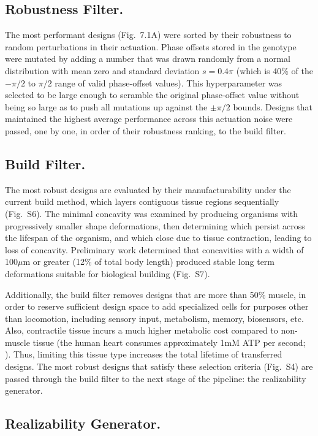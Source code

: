 \subsection*{Robustness Filter.}

The most performant designs (Fig.~7.1A) were sorted by their robustness to random perturbations in their actuation. 
Phase offsets stored in the genotype were mutated by adding a number that was drawn randomly from a normal distribution with mean zero and standard deviation $s = 0.4\pi$ (which is 40\% of the $-\pi/2$ to $\pi/2$ range of valid phase-offset values). 
This hyperparameter was selected to be large enough to scramble the original phase-offset value without being so large as to push all mutations up against the $\pm\pi/2$ bounds. 
Designs that maintained the highest average performance across this actuation noise were passed, one by one, in order of their robustness ranking, to the build filter.

\subsection*{Build Filter.}

The most robust designs are evaluated by their manufacturability under the current build method, which layers contiguous tissue regions sequentially (Fig.~S6). 
The minimal concavity was examined by producing organisms with progressively smaller shape deformations, then determining which persist across the lifespan of the organism, and which close due to tissue contraction, leading to loss of concavity.
Preliminary work determined that concavities with a width of 100{$\mu$}m or greater (12\% of total body length) produced stable long term deformations suitable for biological building (Fig.~S7). 

Additionally, the build filter removes designs that are more than 50\% muscle, in order to reserve sufficient design space to add specialized cells for purposes other than locomotion, including sensory input, metabolism, memory, biosensors, etc. 
Also, contractile tissue incurs a much higher metabolic cost compared to non-muscle tissue (the human heart consumes approximately 1mM ATP per second; \cite{piquereau2018maturation}). 
Thus, limiting this tissue type increases the total lifetime of transferred designs. The most robust designs that satisfy these selection criteria (Fig.~S4) are passed through the build filter to the next stage of the pipeline: the realizability generator.

\subsection*{Realizability Generator.}

